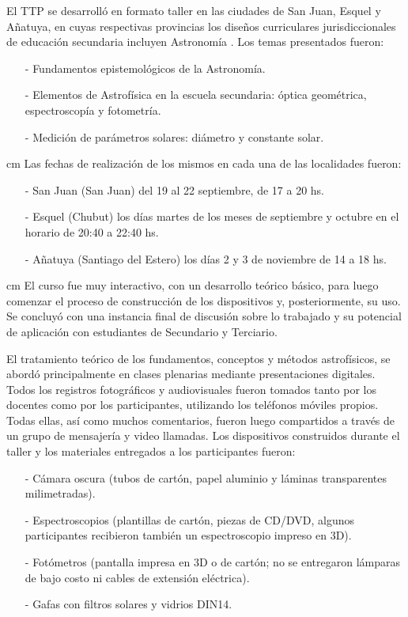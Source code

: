 \documentclass[baaa]{baaa}
\begin{document}
El TTP se desarroll\'o en formato taller en las ciudades de San Juan, Esquel y A\~natuya, en cuyas respectivas provincias los dise\~nos curriculares jurisdiccionales de educaci\'on secundaria incluyen Astronom\'ia \citep{Camino2021,Corti2022}. Los temas presentados fueron:
\begin{itemize}
\item[-] Fundamentos epistemol\'ogicos de la Astronom\'ia.
\item[-] Elementos de Astrof\'isica en la escuela secundaria: \'optica geom\'etrica, espectroscop\'ia y fotometr\'ia.
\item[-] Medici\'on de par\'ametros solares: di\'ametro y constante solar.
\end{itemize}
 cm
Las fechas de realizaci\'on de los mismos en cada una de las localidades fueron: 
\begin{itemize}
\item[-] San Juan (San Juan) del 19 al 22 septiembre, de 17 a 20 hs.
\item[-] Esquel (Chubut) los d\'ias martes de los meses de septiembre y octubre en el horario de 20:40 a 22:40 hs.
\item[-] A\~natuya (Santiago del Estero) los d\'ias 2 y 3 de noviembre de 14 a 18 hs.
\end{itemize}
 cm
El curso fue muy interactivo, con un desarrollo te\'orico b\'asico, para luego comenzar el proceso de construcci\'on de los dispositivos y, posteriormente, su uso. Se concluy\'o con una instancia final de discusi\'on sobre lo trabajado y su potencial de aplicaci\'on con estudiantes de Secundario y Terciario. 

El tratamiento te\'orico de los fundamentos, conceptos y m\'etodos astrof\'isicos, se abord\'o principalmente en clases plenarias mediante presentaciones digitales. Todos los registros fotogr\'aficos y audiovisuales fueron tomados tanto por los docentes como por los participantes, utilizando los tel\'efonos m\'oviles propios. Todas ellas, as\'i como muchos comentarios, fueron luego compartidos a trav\'es de un grupo de mensajer\'ia y video llamadas. Los dispositivos construidos durante el taller y los materiales entregados a los participantes fueron:

\begin{itemize}
\item[-] C\'amara oscura (tubos de cart\'on, papel aluminio y l\'aminas transparentes milimetradas).
\item[-] Espectroscopios (plantillas de cart\'on, piezas de CD/DVD, algunos participantes recibieron tambi\'en un espectroscopio impreso en 3D).
\item[-] Fot\'ometros (pantalla impresa en 3D o de cart\'on; no se entregaron l\'amparas de bajo costo ni cables de extensi\'on el\'ectrica).
\item[-] Gafas con filtros solares y vidrios DIN14.
\end{itemize}
\end{document}
